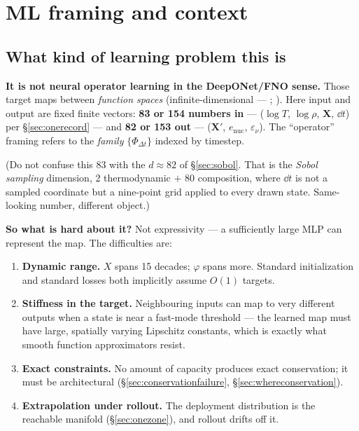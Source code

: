 \section{ML framing and context}
\label{part:ml}

\subsection{What kind of learning problem this is}
\label{sec:learningproblem}

\textbf{It is not neural operator learning in the DeepONet/FNO sense.} Those
target maps between \emph{function spaces} (infinite-dimensional ---
\citealt{lu2021}; \citealt{li2021}). Here input and output are fixed finite
vectors: \textbf{83 or 154 numbers in} --- ($\log T$, $\log\rho$, $\mathbf{X}$,
$\dd t$) per \S\ref{sec:onerecord} --- and \textbf{82 or 153 out} ---
($\mathbf{X}'$, $e_{\text{nuc}}$, $\varepsilon_\nu$). The ``operator'' framing
refers to the \emph{family} $\{\Phi_{\Delta t}\}$ indexed by timestep.

(Do not confuse this 83 with the $d \approx 82$ of \S\ref{sec:sobol}. That is
the \emph{Sobol sampling} dimension, 2 thermodynamic $+$ 80 composition, where
$\dd t$ is not a sampled coordinate but a nine-point grid applied to every drawn
state. Same-looking number, different object.)

\textbf{So what is hard about it?} Not expressivity --- a sufficiently large MLP
can represent the map. The difficulties are:

\begin{enumerate}
\item \textbf{Dynamic range.} $X$ spans 15 decades; $\varphi$ spans more.
      Standard initialization and standard losses both implicitly assume $O(1)$
      targets.
\item \textbf{Stiffness in the target.} Neighbouring inputs can map to very
      different outputs when a state is near a fast-mode threshold --- the
      learned map must have large, spatially varying Lipschitz constants, which
      is exactly what smooth function approximators resist.
\item \textbf{Exact constraints.} No amount of capacity produces exact
      conservation; it must be architectural
      (\S\ref{sec:conservationfailure}, \S\ref{sec:whereconservation}).
\item \textbf{Extrapolation under rollout.} The deployment distribution is the
      reachable manifold (\S\ref{sec:onezone}), and rollout drifts off it.
\end{enumerate}

